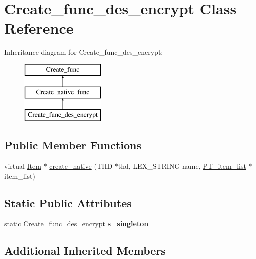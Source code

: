 \hypertarget{classCreate__func__des__encrypt}{}\section{Create\+\_\+func\+\_\+des\+\_\+encrypt Class Reference}
\label{classCreate__func__des__encrypt}
Inheritance diagram for Create\+\_\+func\+\_\+des\+\_\+encrypt\+:\begin{figure}[H]
\begin{center}
\leavevmode
\includegraphics[height=3.000000cm]{classCreate__func__des__encrypt}
\end{center}
\end{figure}
\subsection*{Public Member Functions}
\begin{DoxyCompactItemize}
\item 
virtual \mbox{\hyperlink{classItem}{Item}} $\ast$ \mbox{\hyperlink{classCreate__func__des__encrypt_af04e4d13c157aec97305a5e78e94fb44}{create\+\_\+native}} (T\+HD $\ast$thd, L\+E\+X\+\_\+\+S\+T\+R\+I\+NG name, \mbox{\hyperlink{classPT__item__list}{P\+T\+\_\+item\+\_\+list}} $\ast$item\+\_\+list)
\end{DoxyCompactItemize}
\subsection*{Static Public Attributes}
\begin{DoxyCompactItemize}
\item 
\mbox{\label{classCreate__func__des__encrypt_ac093d4a38c1902bef8cb7f6a088e9b2a}} 
static \mbox{\hyperlink{classCreate__func__des__encrypt}{Create\+\_\+func\+\_\+des\+\_\+encrypt}} {\bfseries s\+\_\+singleton}
\end{DoxyCompactItemize}
\subsection*{Additional Inherited Members}


